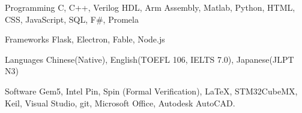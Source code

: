 
\begin{cvskills}
  \cvskill
    {Programming} %
    {C, C++, Verilog HDL, Arm Assembly, Matlab, Python, HTML, CSS, JavaScript, SQL, F\#, Promela} %

  \cvskill
    {Frameworks} %
    {Flask, Electron, Fable, Node.js} %
    
  \cvskill
    {Languages}
    {Chinese(Native), English(TOEFL 106, IELTS 7.0), Japanese(JLPT N3)}
    
  \cvskill
    {Software} %
    {Gem5, Intel Pin, Spin (Formal Verification), LaTeX, STM32CubeMX, Keil, Visual Studio, git, Microsoft Office,  Autodesk AutoCAD.} %
\end{cvskills}
